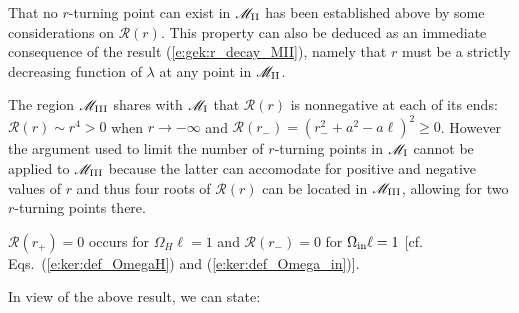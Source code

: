 \begin{remark}
That no $r$-turning point can exist in $\mathscr{M}_{\rm II}$ has been established
above by some considerations on $\mathcal{R}(r)$. This property can also be deduced as
an immediate consequence of the result (\ref{e:gek:r_decay_MII}), namely
that $r$ must be a strictly decreasing function of $\lambda$ at any point
in $\mathscr{M}_{\rm II}$.
\end{remark}


\begin{remark}
The region $\mathscr{M}_{\rm III}$ shares with $\mathscr{M}_{\rm I}$ that $\mathcal{R}(r)$ is
nonnegative at each of its ends: $\mathcal{R}(r) \sim r^4 > 0$ when $r\to -\infty$
and $\mathcal{R}(r_-) = (r_-^2 + a^2 - a \ell)^2 \geq 0$. However the argument
used to limit the number of $r$-turning points in $\mathscr{M}_{\rm I}$
cannot be applied to $\mathscr{M}_{\rm III}$ because the latter can accomodate for positive and negative
values of $r$ and thus four roots of $\mathcal{R}(r)$ can be located in $\mathscr{M}_{\rm III}$, allowing
for two $r$-turning points there.
\end{remark}


\begin{remark}
$\mathcal{R}(r_+) = 0$ occurs for $\Omega_H \ell = 1$
and $\mathcal{R}(r_-) = 0$ for $\Omega_{\rm in} \ell = 1$ [cf. Eqs.~(\ref{e:ker:def_OmegaH}) and (\ref {e:ker:def_Omega_in})].
\end{remark}


In view of the above result, we can state:

